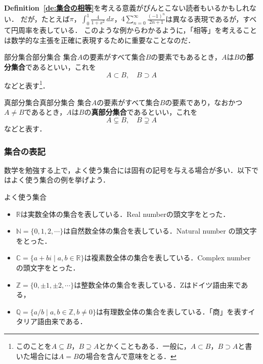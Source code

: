 \documentclass[a4paper,11pt]{ltjsarticle}
\renewcommand{\emph}[1]{\textbf{#1}}
\newcommand{\deref}[1]{\textsf{\bfseries Definition~\ref{de:#1}}}
\begin{document}
\begin{mycolumn}
  \deref{集合の相等}を考える意義がぴんとこない読者もいるかもしれない．
  だが，たとえば$\pi$，$\int_{0}^{1} \frac{4}{1+x^2} \, dx$，$4 \sum_{n=0}^{\infty} \frac{(-1)^n}{2n+1}$は異なる表現であるが，すべて円周率を表している．
  このような例からわかるように，「相等」を考えることは数学的な主張を正確に表現するために重要なことなのだ．
\end{mycolumn}

\begin{definition}{部分集合}{部分集合}
  集合$A$の要素がすべて集合$B$の要素でもあるとき，$A$は$B$の\emph{部分集合}であるといい，これを
  \[
    A \subset B,\quad B \supset A
  \]
  などと表す\footnote{このことを$ A \subseteq B$，$B \supseteq A$とかくこともある．一般に，$A \subset B$，$ B \supset A$と書いた場合には$A=B$の場合を含んで意味をとる．}．
\end{definition}

\begin{definition}{真部分集合}{真部分集合}
  集合$A$の要素がすべて集合$B$の要素であり，なおかつ$A \ne B$であるとき，$A$は$B$の\emph{真部分集合}であるといい，これを
  \[
    A \subsetneq B,\quad B \supsetneq A
  \]
  などと表す．
\end{definition}

\subsubsection{集合の表記}

数学を勉強する上で，よく使う集合には固有の記号を与える場合が多い．以下ではよく使う集合の例を挙げよう．

\begin{shadebox}
  よく使う集合
  \begin{itemize}
    \item $\mathbb{R}$は実数全体の集合を表している．Real numberの頭文字をとった．
    \item $\mathbb{N}=\{0,1,2,\cdots \}$は自然数全体の集合を表している．Natural number の頭文字をとった．
    \item $\mathbb{C}=\{ a+bi \mid a,b \in \mathbb{R}\}$は複素数全体の集合を表している．Complex number の頭文字をとった．
    \item $\mathbb{Z}=\{0, \pm 1 , \pm 2 , \cdots\}$は整数全体の集合を表している．Zはドイツ語由来である，
    \item $\mathbb{Q}=\{ a/b \mid   a,b \in \mathbb{Z},b \ne 0 \}$は有理数全体の集合を表している．「商」を表すイタリア語由来である．
  \end{itemize}
\end{shadebox}
\end{document}
